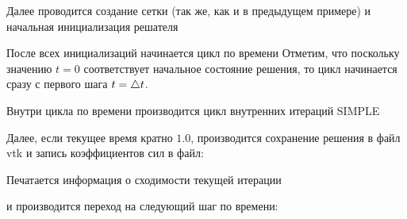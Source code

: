 Далее проводится создание сетки (так же, как и в предыдущем примере) и начальная инициализация
решателя

После всех инициализаций начинается цикл по времени
Отметим, что поскольку значению $t=0$ соответствует начальное
состояние решения, то цикл начинается сразу с первого шага $t=\triangle t$.

Внутри цикла по времени производится цикл
внутренних итераций SIMPLE

Далее, если текущее время кратно $1.0$, производится сохранение
решения в файл vtk и запись коэффициентов сил в файл:

Печатается информация о сходимости текущей итерации

и производится переход на следующий шаг по времени:

